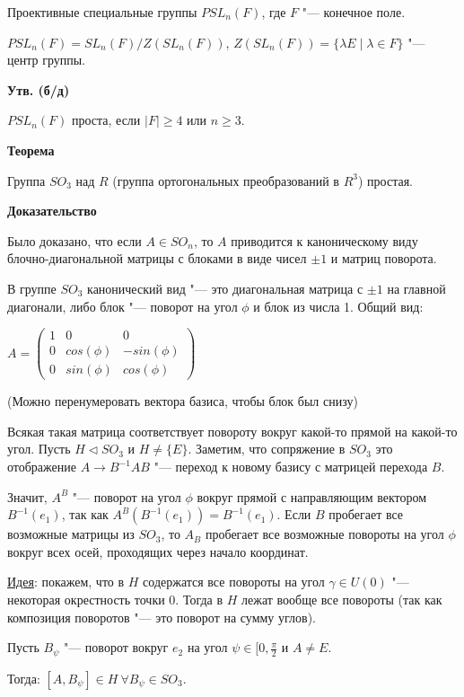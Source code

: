 \documentclass{article}
\begin{document}
Проективные специальные группы $PSL_n(F)$, где $F$ "--- конечное поле.

$PSL_n(F) = SL_n(F) / Z(SL_n(F))$, $Z(SL_n(F)) = \{\lambda E \mid \lambda \in F\}$ "--- центр группы.

\vspace{5pt}

\textbf{Утв. (б/д)}

$PSL_n(F)$ проста, если $|F| \geq 4$ или $n \geq 3$.

\textbf{Теорема}

Группа $SO_3$ над $R$ (группа ортогональных преобразований в $R^3$) простая.

\textbf{Доказательство}

Было доказано, что если $A \in SO_n$, то $A$ приводится к каноническому виду блочно-диагональной матрицы с блоками в виде чисел $\pm 1$ и матриц поворота.

В группе $SO_3$ канонический вид "--- это диагональная матрица с $\pm 1$ на главной диагонали, либо блок "--- поворот на угол $\phi$ и блок из числа 1. Общий вид:

$A = \begin{pmatrix}
1 & 0 & 0 \\
0 & cos(\phi) & -sin(\phi) \\
0 & sin(\phi) & cos(\phi)
\end{pmatrix}$

(Можно перенумеровать вектора базиса, чтобы блок был снизу)

Всякая такая матрица соответствует повороту вокруг какой-то прямой на какой-то угол. Пусть $H \triangleleft SO_3$ и $H \neq \{E\}$. Заметим, что сопряжение в $SO_3$ это отображение $A \rightarrow B^{-1}AB$ "--- переход к новому базису с матрицей перехода $B$.

Значит, $A^B$ "--- поворот на угол $\phi$ вокруг прямой с направляющим вектором $B^{-1}(e_1)$, так как $A^B(B^{-1}(e_1)) = B^{-1}(e_1)$. Если $B$ пробегает все возможные матрицы из $SO_3$, то $A_B$ пробегает все возможные повороты на угол $\phi$ вокруг всех осей, проходящих через начало координат.

\underline{Идея}: покажем, что в $H$ содержатся все повороты на угол $\gamma \in U(0)$ "--- некоторая окрестность точки 0. Тогда в $H$ лежат вообще все повороты (так как композиция поворотов "--- это поворот на сумму углов).

Пусть $B_{\psi}$ "--- поворот вокруг $e_2$ на угол $\psi \in [0, \frac{\pi}{2}$ и $A \neq E$. 

Тогда: $[A, B_{\psi}] \in H \  \forall B_{\psi} \in SO_3$.
\end{document}
